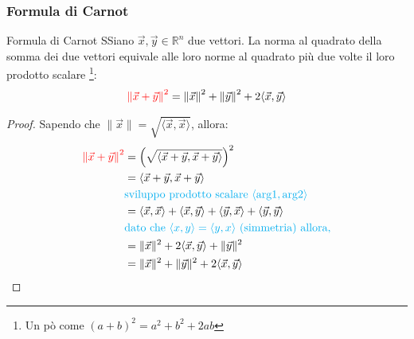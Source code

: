 \documentclass{article}  %
\begin{document}
\subsubsection{Formula di Carnot}
\begin{theorem}{Formula di Carnot}
	SSiano $\vec{x},\vec{y} \in \mathbb{R}^n$ due vettori. La norma al quadrato della somma dei due vettori equivale alle loro norme al quadrato più due volte il loro prodotto scalare
	\footnote{Un pò come $(a+b)^2=a^2+b^2+2ab$}:
	\[
		\textcolor{red}{\left\|\vec{x}+\vec{y}\right\|^2}=\left\|\vec{x}\right\|^2+\left\|\vec{y}\right\|^2+2\langle \vec{x}, \vec{y} \rangle
	\]
	\begin{proof}
		Sapendo che $\|\vec{x}\|=\sqrt{\langle \vec{x}, \vec{x} \rangle}$, allora:
		\begin{align*}
			\textcolor{red}{\left\|\vec{x}+\vec{y}\right\|^2}
			 & = \left(\sqrt{\langle \vec{x} + \vec{y}, \vec{x} + \vec{y} \rangle}\right)^2                                                                \\
			 & = {\langle \vec{x} + \vec{y}, \vec{x} + \vec{y} \rangle}                                                                                    \\
			 & \textcolor{cyan}{\text{sviluppo prodotto scalare } \langle \text{arg1} ,  \text{arg2} \rangle}                                              \\
			 & = \langle \vec{x}, \vec{x} \rangle + \langle \vec{x}, \vec{y} \rangle + \langle \vec{y}, \vec{x} \rangle + \langle \vec{y}, \vec{y} \rangle \\
			 & \textcolor{cyan}{\text{dato che } \langle x,y \rangle = \langle y,x \rangle \text{ (simmetria) allora,}}                                    \\
			 & = \|\vec{x}\|^2+ 2\langle \vec{x}, \vec{y} \rangle + \|\vec{y}\|^2                                                                          \\
			 & = \|\vec{x}\|^2 + \|\vec{y}\|^2 + 2\langle \vec{x}, \vec{y} \rangle
		\end{align*}
	\end{proof}
\end{theorem}
\end{document}

